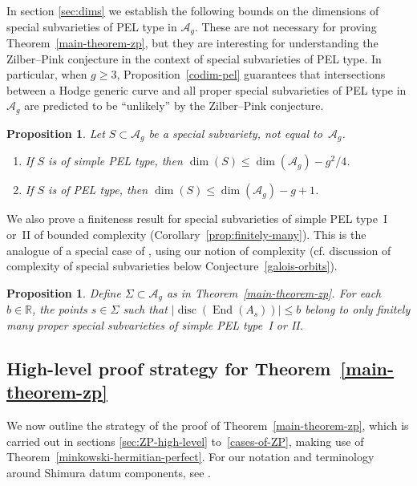 \documentclass[11pt]{article}
\newcommand{\cf}{cf.\xspace}
\numberwithin{equation}{section}
\newenvironment{enumeratei}
{\bgroup\def\theenumi{\roman{enumi}}\def\theenumii{\alph{enumii}}\begin{enumerate}}
{\end{enumerate}\egroup}
\newcommand{\bR}{\mathbb{R}}
\newcommand{\Ag}{\mathcal{A}_g}
\DeclareMathOperator{\disc}{disc}
\DeclareMathOperator{\End}{End}
\newcommand{\abs}[1]{\lvert #1 \rvert}
\newtheorem{proposition}[lemma]{Proposition}
\begin{document}
In section \ref{sec:dims} we establish the following bounds on the dimensions of special subvarieties of PEL type in $\Ag$. These are not necessary for proving Theorem~\ref{main-theorem-zp}, but they are interesting for understanding the Zilber--Pink conjecture in the context of special subvarieties of PEL type.
In particular, when $g \geq 3$, Proposition~\ref{codim-pel} guarantees that intersections between a Hodge generic curve and all proper special subvarieties of PEL type in $\Ag$ are predicted to be ``unlikely'' by the Zilber--Pink conjecture.

\begin{proposition}\label{codim-pel-intro}
Let $S \subset \Ag$ be a special subvariety, not equal to~$\Ag$.
\begin{enumeratei}
\item\label{codim-pel-introi} If $S$ is of simple PEL type, then $\dim(S) \leq \dim(\Ag) - g^2/4$.
\item\label{codim-pel-introii} If $S$ is of PEL type, then $\dim(S) \leq \dim(\Ag) - g + 1$.
\end{enumeratei}
\end{proposition}

We also prove a finiteness result for special subvarieties of simple PEL type~I or~II of bounded complexity (Corollary~\ref{prop:finitely-many}).
This is the analogue of a special case of \cite[Conj.\,10.3]{DR18}, using our notion of complexity (\cf discussion of complexity of special subvarieties below Conjecture~\ref{galois-orbits}).

\begin{proposition}\label{prop:finitely-many-intro}
Define $\Sigma \!\subset\! \Ag$ as in Theorem~\ref{main-theorem-zp}.
For each $b\in\bR$, the points \hbox{$s\!\in\!\Sigma$} such that $\abs{\disc(\End(A_s))} \leq b$ belong to only finitely many proper special subvarieties of simple PEL type~I or II.
\end{proposition}

\subsection{High-level proof strategy for Theorem~\ref{main-theorem-zp}} \label{subsec:proof-strategy-high-level}

We now outline the strategy of the proof of Theorem~\ref{main-theorem-zp}, which is carried out in sections \ref{sec:ZP-high-level} to~\ref{cases-of-ZP}, making use of Theorem~\ref{minkowski-hermitian-perfect}. For our notation and terminology around Shimura datum components, see \cite[\S\S 2.A \&~2.B]{ExCM}.
\end{document}
